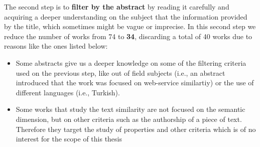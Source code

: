 The second step is to \textbf{filter by the abstract} by reading it carefully and acquiring a deeper understanding on the subject that the information provided by the title, which sometimes might be vague or imprecise. In this second step we reduce the number of works from 74 to \textbf{34}, discarding a total of 40 works due to reasons like the ones listed below:
\begin{itemize}
\item Some abstracts give us a deeper knowledge on some of the filtering criteria used on the previous step, like out of field subjects (i.e., an abstract introduced that the work was focused on web-service similartiy) or the use of different languages (i.e., Turkish).
\item Some works that study the text similarity are not focused on the semantic dimension, but on other criteria such as the authorship of a piece of text. Therefore they target the study of properties and other criteria which is of no interest for the scope of this thesis
\end{itemize}

